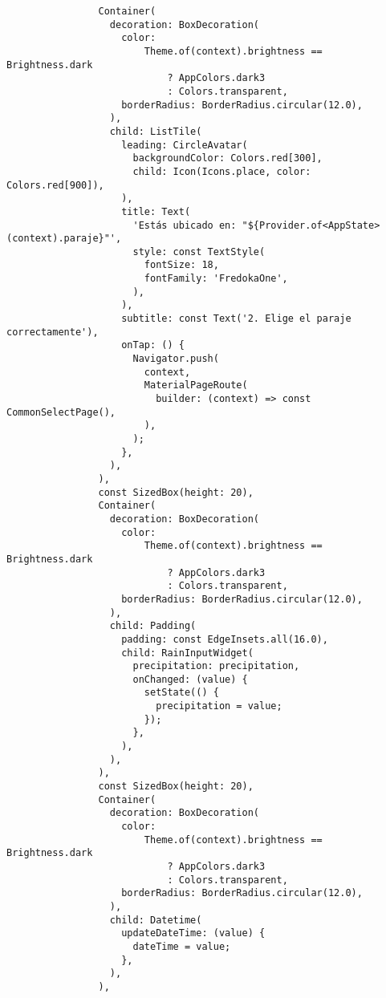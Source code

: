 \begin{verbatim}
                Container(
                  decoration: BoxDecoration(
                    color:
                        Theme.of(context).brightness == Brightness.dark
                            ? AppColors.dark3
                            : Colors.transparent,
                    borderRadius: BorderRadius.circular(12.0),
                  ),
                  child: ListTile(
                    leading: CircleAvatar(
                      backgroundColor: Colors.red[300],
                      child: Icon(Icons.place, color: Colors.red[900]),
                    ),
                    title: Text(
                      'Estás ubicado en: "${Provider.of<AppState>(context).paraje}"',
                      style: const TextStyle(
                        fontSize: 18,
                        fontFamily: 'FredokaOne',
                      ),
                    ),
                    subtitle: const Text('2. Elige el paraje correctamente'),
                    onTap: () {
                      Navigator.push(
                        context,
                        MaterialPageRoute(
                          builder: (context) => const CommonSelectPage(),
                        ),
                      );
                    },
                  ),
                ),
                const SizedBox(height: 20),
                Container(
                  decoration: BoxDecoration(
                    color:
                        Theme.of(context).brightness == Brightness.dark
                            ? AppColors.dark3
                            : Colors.transparent,
                    borderRadius: BorderRadius.circular(12.0),
                  ),
                  child: Padding(
                    padding: const EdgeInsets.all(16.0),
                    child: RainInputWidget(
                      precipitation: precipitation,
                      onChanged: (value) {
                        setState(() {
                          precipitation = value;
                        });
                      },
                    ),
                  ),
                ), 
                const SizedBox(height: 20),
                Container(
                  decoration: BoxDecoration(
                    color:
                        Theme.of(context).brightness == Brightness.dark
                            ? AppColors.dark3
                            : Colors.transparent,
                    borderRadius: BorderRadius.circular(12.0),
                  ),
                  child: Datetime(
                    updateDateTime: (value) {
                      dateTime = value;
                    },
                  ),
                ),
 

\end{verbatim}
